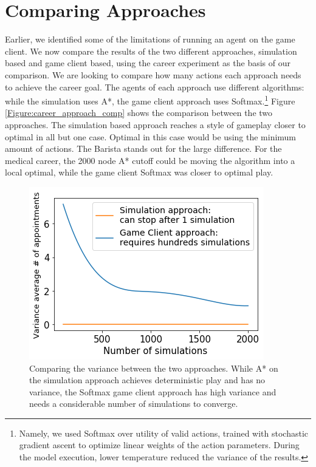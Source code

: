 \documentclass[letterpaper]{article} %
\begin{document}
\vspace{-0.79mm}
\vspace{-1.70mm}
\section{Comparing Approaches}

Earlier, we identified some of the limitations of running an agent on the game client. We now compare the results of the two different approaches, simulation based and  game client based, using the career experiment as the basis of our comparison. We are looking to compare how many actions each approach needs to achieve the career goal. The agents of each approach use different algorithms: while the simulation uses A*, the game client approach uses Softmax.\footnote{Namely, we used Softmax over utility of valid actions, trained with stochastic gradient ascent to optimize linear weights of the action parameters.
During the model execution, lower temperature reduced the variance of the results.
}  Figure \ref{Figure:career_approach_comp} shows the comparison between the two approaches. The simulation based approach reaches a style of gameplay closer to optimal in all but one case. Optimal in this case would be using the minimum amount of actions. The Barista stands out for the large difference. For the medical career, the 2000 node A* cutoff could be moving the algorithm into a local optimal, while the game client Softmax was closer to optimal play.

\begin{figure}[t]
\centering
\includegraphics[width=0.943\linewidth]{images/career_average.png}
\caption{Comparing the variance between the two approaches. While A* on the simulation approach achieves deterministic play and has no variance, the Softmax game client approach has high variance and needs a considerable number of simulations to converge.}
\label{Figure:approach_variance_comp}
\end{figure}
\end{document}
